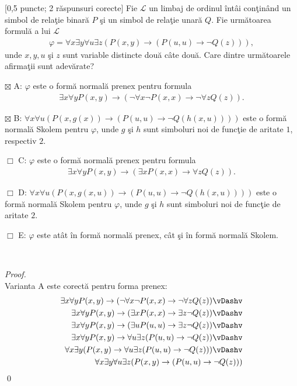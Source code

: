 \documentclass[12pt]{article}
\newcommand{\probex}{\stepcounter{uebno}{\vspace{0.3cm}\noindent \bf (P\arabic{uebno}) }}
\newcommand{\solutiong}[1]{$\,$ \\ \begin{proof}\mbox{}\\#1 \qed \end{proof}}
\begin{document}
\probex [0,5 puncte; 2 r\u{a}spunsuri corecte]
Fie $\mathcal{L}$ un limbaj de ordinul \^{i}nt\^{a}i con\c{t}in\^{a}nd 
un simbol de rela\c{t}ie binar\u{a} $P$ \c{s}i un simbol de rela\c{t}ie unar\u{a} 
$Q$.
Fie urm\u{a}toarea formul\u{a} a lui $\mathcal{L}$
\begin{align*}
\varphi = \forall x \exists y \forall u \exists z 
(P(x, y) \to (P(u, u) \to \neg Q(z))), 
\end{align*}
unde $x, y, u$ \c{s}i $z$ sunt variable distincte dou\u{a} c\^{a}te dou\u{a}.
Care dintre urm\u{a}toarele afirma\c{t}ii sunt adev\u{a}rate? 

$\boxtimes$ A: $\varphi$ este o form\u{a} normal\u{a} prenex pentru formula 
\begin{align*}
\exists x \forall y P(x, y) \to (\neg \forall x \neg P(x, x) \to \neg \forall z Q(z)).
\end{align*}

$\boxtimes$ B: $\forall x \forall u (P(x, g(x)) \to (P(u, u) \to \neg Q(h(x, u))))$ este o form\u{a} normal\u{a} Skolem pentru $\varphi$,
unde $g$ \c{s}i $h$ sunt simboluri noi de func\c{t}ie de aritate $1$, respectiv $2$.

$\Box$ C: $\varphi$ este o form\u{a} normal\u{a} prenex pentru formula 
\begin{align*}
\exists x \forall y P(x, y) \to (\exists x P(x, x) \to \forall z Q(z)).
\end{align*}

$\Box$ D: $\forall x \forall u (P(x, g(x, u)) \to (P(u, u) \to \neg Q(h(x, u))))$ este o form\u{a} normal\u{a} Skolem pentru $\varphi$,
unde $g$ \c{s}i $h$ sunt simboluri noi de func\c{t}ie de aritate $2$. 

$\Box$ E: $\varphi$ este at\^{a}t \^{i}n form\u{a} normal\u{a} prenex, c\^{a}t \c{s}i \^{i}n form\u{a} normal\u{a} Skolem.

\solutiong{
Varianta A este corect\u{a} pentru forma prenex: 
\begin{align*}
    \exists x \forall y P(x, y) \to (\neg \forall x \neg P(x, x) \to \neg \forall z Q(z)) \vDashv \\ 
    \exists x \forall y P(x, y) \to (\exists x P(x, x) \to \exists z \neg Q(z)) \vDashv \\ 
    \exists x \forall y P(x, y) \to (\exists u P(u, u) \to \exists z \neg Q(z)) \vDashv \\ 
    \exists x \forall y P(x, y) \to \forall u \exists z (P(u, u) \to \neg Q(z)) \vDashv \\ 
    \forall x \exists y (P(x, y) \to \forall u \exists z (P(u, u) \to \neg Q(z))) \vDashv \\ 
    \forall x \exists y \forall u \exists z (P(x, y) \to (P(u, u) \to \neg Q(z))) \\ 
\end{align*}
}
\end{document}

